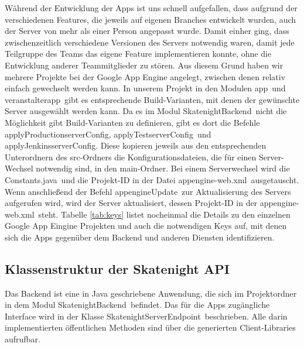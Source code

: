 Während der Entwicklung der Apps ist uns schnell aufgefallen, dass aufgrund der verschiedenen Features, die jeweils auf eigenen Branches entwickelt wurden, auch der Server von mehr als einer Person angepasst wurde. Damit einher ging, dass zwischenzeitlich verschiedene Versionen des Servers notwendig waren, damit jede Teilgruppe des Teams das eigene Feature implementieren konnte, ohne die Entwicklung anderer Teammitglieder zu stören. Aus diesem Grund haben wir mehrere Projekte bei der Google App Engine angelegt, zwischen denen relativ einfach gewechselt werden kann. In unserem Projekt in den Modulen \glqq app\grqq\ und \glqq veranstalterapp\grqq\ gibt es entsprechende Build-Varianten, mit denen der gewünschte Server ausgewählt werden kann. Da es im Modul \glqq SkatenightBackend\grqq\ nicht die Möglichkeit gibt Build-Varianten zu definieren, gibt es dort die Befehle \glqq applyProductionserverConfig\grqq, \glqq applyTestserverConfig\grqq\ und \glqq applyJenkinsserverConfig\grqq. Diese kopieren jeweils aus den entsprechenden Unterordnern des src-Ordners die Konfigurationsdateien, die für einen Server-Wechsel notwendig sind, in den main-Ordner. Bei einem Serverwechsel wird die \glqq Constants.java\grqq\ und die Projekt-ID in der Datei \glqq appengine-web.xml\grqq\ ausgetauscht. Wenn anschließend der Befehl \glqq appengineUpdate\grqq\ zur Aktualisierung des Servers aufgerufen wird, wird der Server aktualisiert, dessen Projekt-ID in der \glqq appengine-web.xml\grqq\ steht. Tabelle \ref{tab:keys} listet nocheinmal die Details zu den einzelnen Google App Eingine Projekten und auch die notwendigen Keys auf, mit denen sich die Apps gegenüber dem Backend und anderen Diensten identifizieren.

\subsection{Klassenstruktur der Skatenight API}
Das Backend ist eine in Java geschriebene Anwendung, die sich im Projektordner in dem Modul \glqq SkatenightBackend\grqq\ befindet. Das für die Apps zugängliche Interface wird in der Klasse \glqq SkatenightServerEndpoint\grqq\ beschrieben. Alle darin implementierten öffentlichen Methoden sind über die generierten Client-Libraries aufrufbar.

